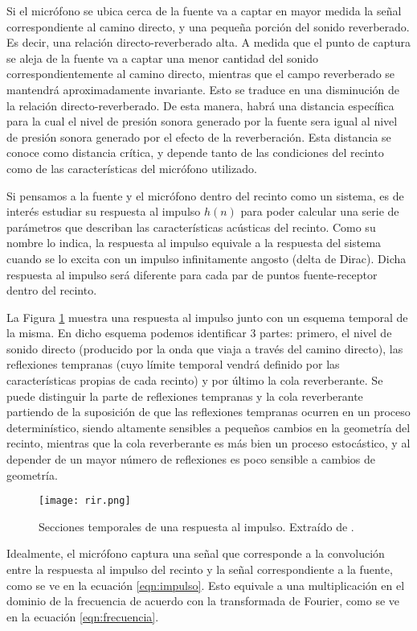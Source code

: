 Si el micrófono se ubica cerca de la fuente va a captar en mayor medida la señal correspondiente al camino directo, y una pequeña porción del sonido reverberado. Es decir, una relación directo-reverberado alta. A medida que el punto de captura se aleja de la fuente va a captar una menor cantidad del sonido correspondientemente al camino directo, mientras que el campo reverberado se mantendrá aproximadamente invariante. Esto se traduce en una disminución de la relación directo-reverberado. 
De esta manera, habrá una distancia específica para la cual el nivel de presión sonora generado por la fuente sera igual al nivel de presión sonora generado por el efecto de la reverberación. Esta distancia se conoce como distancia crítica, y depende tanto de las condiciones del recinto como de las características del micrófono utilizado. 

Si pensamos a la fuente y el micrófono dentro del recinto como un sistema, es de interés estudiar su respuesta al impulso $h(n)$ para poder calcular una serie de parámetros que describan las características acústicas del recinto. Como su nombre lo indica, la respuesta al impulso equivale a la respuesta del sistema cuando se lo excita con un impulso infinitamente angosto (delta de Dirac). Dicha respuesta al impulso será diferente para cada par de puntos fuente-receptor dentro del recinto.   


La Figura \ref{fig:rir} muestra una respuesta al impulso junto con un esquema temporal de la misma. En dicho esquema podemos identificar 3 partes: primero, el nivel de sonido directo (producido por la onda que viaja a través del camino directo), las reflexiones tempranas (cuyo límite temporal vendrá definido por las características propias de cada recinto) y por último la cola reverberante. Se puede distinguir la parte de reflexiones tempranas y la cola reverberante partiendo de la suposición de que las reflexiones tempranas ocurren en un proceso determinístico, siendo altamente sensibles a pequeños cambios en la geometría del recinto, mientras que la cola reverberante es más bien un proceso estocástico, y al depender de un mayor número de reflexiones es poco sensible a cambios de geometría. 

\begin{figure}[H]
  \centering{}
  \texttt{[image: rir.png]}
  \caption{Secciones temporales de una respuesta al impulso. Extraído de \cite{rir}.}
  \label{fig:rir}
\end{figure}

Idealmente, el micrófono captura una señal que corresponde a la convolución entre la respuesta al impulso del recinto y la señal correspondiente a la fuente, como se ve en la ecuación \ref{eqn:impulso}. Esto equivale a una multiplicación en el dominio de la frecuencia de acuerdo con la transformada de Fourier, como se ve en la ecuación \ref{eqn:frecuencia}.  


